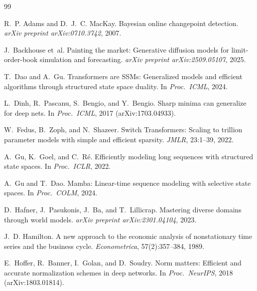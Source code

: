 \documentclass{article}
\begin{document}
\begin{thebibliography}{99}

R.~P. Adams and D.~J.~C. MacKay.
\newblock Bayesian online changepoint detection.
\newblock \emph{arXiv preprint arXiv:0710.3742}, 2007.

J.~Backhouse et~al.
\newblock Painting the market: Generative diffusion models for limit-order-book simulation and forecasting.
\newblock \emph{arXiv preprint arXiv:2509.05107}, 2025.

T.~Dao and A.~Gu.
\newblock Transformers are {SSMs}: Generalized models and efficient algorithms through structured state space duality.
\newblock In \emph{Proc.\ ICML}, 2024.

L.~Dinh, R.~Pascanu, S.~Bengio, and Y.~Bengio.
\newblock Sharp minima can generalize for deep nets.
\newblock In \emph{Proc.\ ICML}, 2017 (arXiv:1703.04933).

W.~Fedus, B.~Zoph, and N.~Shazeer.
\newblock Switch {T}ransformers: Scaling to trillion parameter models with simple and efficient sparsity.
\newblock \emph{JMLR}, 23:1--39, 2022.

A.~Gu, K.~Goel, and C.~R\'e.
\newblock Efficiently modeling long sequences with structured state spaces.
\newblock In \emph{Proc.\ ICLR}, 2022.

A.~Gu and T.~Dao.
\newblock Mamba: Linear-time sequence modeling with selective state spaces.
\newblock In \emph{Proc.\ COLM}, 2024.

D.~Hafner, J.~Pasukonis, J.~Ba, and T.~Lillicrap.
\newblock Mastering diverse domains through world models.
\newblock \emph{arXiv preprint arXiv:2301.04104}, 2023.

J.~D. Hamilton.
\newblock A new approach to the economic analysis of nonstationary time series and the business cycle.
\newblock \emph{Econometrica}, 57(2):357--384, 1989.

E.~Hoffer, R.~Banner, I.~Golan, and D.~Soudry.
\newblock Norm matters: Efficient and accurate normalization schemes in deep networks.
\newblock In \emph{Proc.\ NeurIPS}, 2018 (arXiv:1803.01814).


\end{thebibliography}
\end{document}
